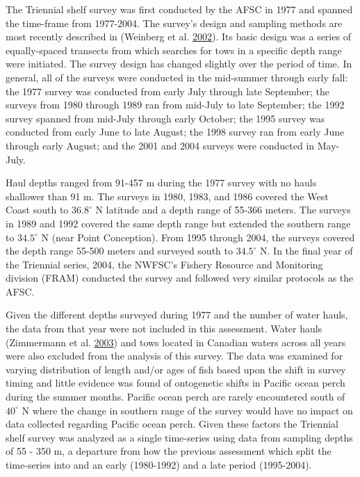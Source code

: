 \documentclass[12pt,]{article}
\begin{document}
The Triennial shelf survey was first conducted by the AFSC in 1977 and
spanned the time-frame from 1977-2004. The survey's design and sampling
methods are most recently described in (Weinberg et al.
\protect\hyperlink{ref-weinberg_estimation_2002}{2002}). Its basic
design was a series of equally-spaced transects from which searches for
tows in a specific depth range were initiated. The survey design has
changed slightly over the period of time. In general, all of the surveys
were conducted in the mid-summer through early fall: the 1977 survey was
conducted from early July through late September; the surveys from 1980
through 1989 ran from mid-July to late September; the 1992 survey
spanned from mid-July through early October; the 1995 survey was
conducted from early June to late August; the 1998 survey ran from early
June through early August; and the 2001 and 2004 surveys were conducted
in May-July.

Haul depths ranged from 91-457 m during the 1977 survey with no hauls
shallower than 91 m. The surveys in 1980, 1983, and 1986 covered the
West Coast south to \(36.8^\circ\) N latitude and a depth range of
55-366 meters. The surveys in 1989 and 1992 covered the same depth range
but extended the southern range to \(34.5^\circ\) N (near Point
Conception). From 1995 through 2004, the surveys covered the depth range
55-500 meters and surveyed south to \(34.5^\circ\) N. In the final year
of the Triennial series, 2004, the NWFSC's Fishery Resource and
Monitoring division (FRAM) conducted the survey and followed very
similar protocols as the AFSC.

Given the different depths surveyed during 1977 and the number of water
hauls, the data from that year were not included in this assessment.
Water hauls (Zimmermann et al.
\protect\hyperlink{ref-zimmermann_influence_2003}{2003}) and tows
located in Canadian waters across all years were also excluded from the
analysis of this survey. The data was examined for varying distribution
of length and/or ages of fish based upon the shift in survey timing and
little evidence was found of ontogenetic shifts in Pacific ocean perch
during the summer months. Pacific ocean perch are rarely encountered
south of \(40^\circ\) N where the change in southern range of the survey
would have no impact on data collected regarding Pacific ocean perch.
Given these factors the Triennial shelf survey was analyzed as a single
time-series using data from sampling depths of 55 - 350 m, a departure
from how the previous assessment which split the time-series into and an
early (1980-1992) and a late period (1995-2004).
\end{document}
